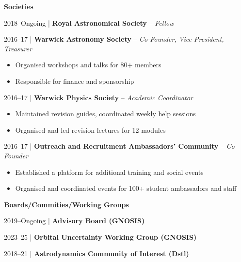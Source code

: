 \documentclass[10pt,a4paper]{altacv}
\begin{document}
\divider

\normalsize \textbf{Societies}

\medskip

\small 2018--Ongoing | \textbf{Royal Astronomical Society} -- \textit{Fellow} \\

\smallskip

\small 2016--17 | \textbf{Warwick Astronomy Society} -- \textit{Co-Founder, Vice President, Treasurer} \\
\smallskip
\begin{itemize}
	\item Organised workshops and talks for 80+ members
	\item Responsible for finance and sponsorship
\end{itemize}

\smallskip

\small 2016--17 | \textbf{Warwick Physics Society} -- \textit{Academic Coordinator} \\
\smallskip
\begin{itemize}
	\item Maintained revision guides, coordinated weekly help sessions
	\item Organised and led revision lectures for 12 modules
\end{itemize}

\smallskip

\small 2016--17 | \textbf{Outreach and Recruitment Ambassadors' Community} -- \textit{Co-Founder} \\
\smallskip
\begin{itemize}
	\item Established a platform for additional training and social events
	\item Organised and coordinated events for 100+ student ambassadors and staff
\end{itemize}

\divider

\normalsize \textbf{Boards/Commities/Working Groups}

\medskip

\small 2019--Ongoing | \textbf{Advisory Board (GNOSIS)} \\

\smallskip

\small 2023--25 | \textbf{Orbital Uncertainty Working Group (GNOSIS)} \\

\smallskip

\small 2018--21 | \textbf{Astrodynamics Community of Interest (Dstl)} \\
\end{document}
